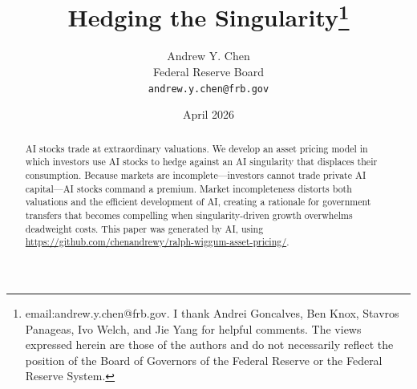 \documentclass[12pt]{article}
\title{Hedging the Singularity\thanks{email:andrew.y.chen@frb.gov. I thank Andrei Goncalves, Ben Knox, Stavros Panageas, Ivo Welch, and Jie Yang for helpful comments. The views expressed herein are those of the authors and do not necessarily reflect the position of the Board of Governors of the Federal Reserve or the Federal Reserve System.}}
\author{Andrew Y. Chen \\ Federal Reserve Board \\ \texttt{andrew.y.chen@frb.gov}}
\date{April 2026}
\begin{document}
\maketitle
\thispagestyle{plain}

\begin{abstract}
\noindent AI stocks trade at extraordinary valuations. We develop an asset pricing model in which investors use AI stocks to hedge against an AI singularity that displaces their consumption. Because markets are incomplete---investors cannot trade private AI capital---AI stocks command a premium. Market incompleteness distorts both valuations and the efficient development of AI, creating a rationale for government transfers that becomes compelling when singularity-driven growth overwhelms deadweight costs. This paper was generated by AI, using \url{https://github.com/chenandrewy/ralph-wiggum-asset-pricing/}. 
\end{abstract}
\end{document}
